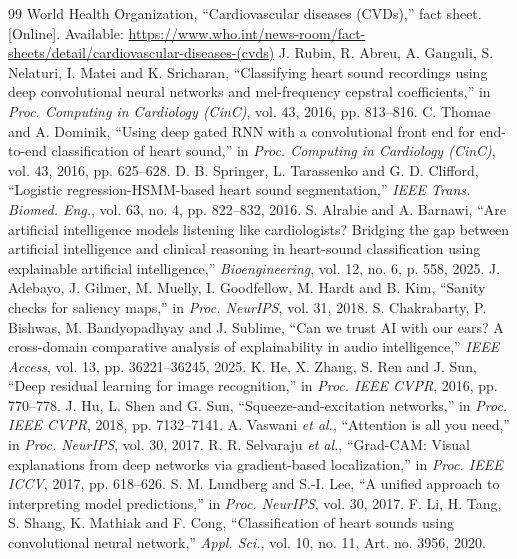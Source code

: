 \documentclass[conference]{IEEEtran}
\begin{document}
\begin{thebibliography}{99}
 World Health Organization, ``Cardiovascular diseases (CVDs),'' fact sheet. [Online]. Available: \url{https://www.who.int/news-room/fact-sheets/detail/cardiovascular-diseases-(cvds)}
 J. Rubin, R. Abreu, A. Ganguli, S. Nelaturi, I. Matei and K. Sricharan, ``Classifying heart sound recordings using deep convolutional neural networks and mel-frequency cepstral coefficients,'' in \textit{Proc. Computing in Cardiology (CinC)}, vol. 43, 2016, pp. 813--816.
 C. Thomae and A. Dominik, ``Using deep gated RNN with a convolutional front end for end-to-end classification of heart sound,'' in \textit{Proc. Computing in Cardiology (CinC)}, vol. 43, 2016, pp. 625--628.
 D. B. Springer, L. Tarassenko and G. D. Clifford, ``Logistic regression-HSMM-based heart sound segmentation,'' \textit{IEEE Trans. Biomed. Eng.}, vol. 63, no. 4, pp. 822--832, 2016.
 S. Alrabie and A. Barnawi, ``Are artificial intelligence models listening like cardiologists? Bridging the gap between artificial intelligence and clinical reasoning in heart-sound classification using explainable artificial intelligence,'' \textit{Bioengineering}, vol. 12, no. 6, p. 558, 2025.
 J. Adebayo, J. Gilmer, M. Muelly, I. Goodfellow, M. Hardt and B. Kim, ``Sanity checks for saliency maps,'' in \textit{Proc. NeurIPS}, vol. 31, 2018.
 S. Chakrabarty, P. Bishwas, M. Bandyopadhyay and J. Sublime, ``Can we trust AI with our ears? A cross-domain comparative analysis of explainability in audio intelligence,'' \textit{IEEE Access}, vol. 13, pp. 36221--36245, 2025.
 K. He, X. Zhang, S. Ren and J. Sun, ``Deep residual learning for image recognition,'' in \textit{Proc. IEEE CVPR}, 2016, pp. 770--778.
 J. Hu, L. Shen and G. Sun, ``Squeeze-and-excitation networks,'' in \textit{Proc. IEEE CVPR}, 2018, pp. 7132--7141.
 A. Vaswani \textit{et al.}, ``Attention is all you need,'' in \textit{Proc. NeurIPS}, vol. 30, 2017.
 R. R. Selvaraju \textit{et al.}, ``Grad-CAM: Visual explanations from deep networks via gradient-based localization,'' in \textit{Proc. IEEE ICCV}, 2017, pp. 618--626.
 S. M. Lundberg and S.-I. Lee, ``A unified approach to interpreting model predictions,'' in \textit{Proc. NeurIPS}, vol. 30, 2017.
 F. Li, H. Tang, S. Shang, K. Mathiak and F. Cong, ``Classification of heart sounds using convolutional neural network,'' \textit{Appl. Sci.}, vol. 10, no. 11, Art. no. 3956, 2020.

\end{thebibliography}
\end{document}
